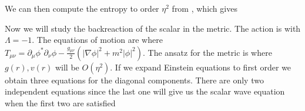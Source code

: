 \eqn{}
We can then compute the entropy to order $\eta^2$ from \entrog , which gives
\eqn{}


Now we will study the backreaction of the scalar in the metric. The action is
\eqn{}
with $\Lambda=-1$. The equations of motion are
\eqn{}
where $T_{\mu \nu}=\partial_{\mu} \phi^{*} \partial_{\nu} \phi-\frac{g_{\mu \nu}}{2} (| \nabla \phi |^2+m^2 |\phi|^2)$.
The ansatz for the metric is
\eqn{}
where $g(r),v(r)$ will be $O(\eta^2)$. If we expand Einstein equations to first order we obtain three
 equations for the diagonal components.
There are only two independent equations since the last one will give us the scalar wave equation when the first two are satisfied
\eqn{}







